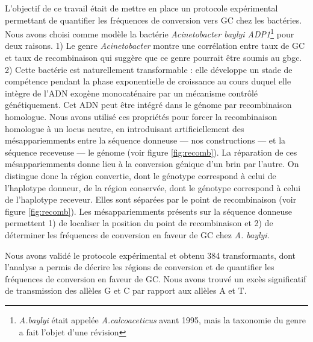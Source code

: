 L'objectif de ce travail était de mettre en place un protocole expérimental
permettant de quantifier les fréquences de conversion vers GC chez les
bactéries. Nous avons choisi comme modèle la bactérie \emph{Acinetobacter baylyi
  ADP1}\footnote{\emph{A.baylyi} était appelée \emph{A.calcoaceticus} avant
  1995, mais la taxonomie du genre a fait l'objet d'une
  révision\cite{euzeby_list_1997}} pour deux raisons. 1) Le genre
\emph{Acinetobacter} montre une corrélation entre taux de GC et taux de
recombinaison\cite{lassalle_gc-content_2015} qui suggère que ce genre pourrait
être soumis au \ac{gbgc}. 2) Cette bactérie est naturellement transformable :
elle développe un stade de compétence pendant la phase exponentielle de
croissance au cours duquel elle intègre de l'ADN exogène monocaténaire par un
mécanisme contrôlé génétiquement\cite{chen_dna_2004}. Cet ADN peut être intégré
dans le génome par recombinaison homologue. Nous avons utilisé ces propriétés
pour forcer la recombinaison homologue à un locus neutre, en introduisant
artificiellement des mésappariemments entre la séquence donneuse --- nos
constructions --- et la séquence receveuse --- le génome (voir figure
\ref{fig:recomb}). La réparation de ces mésappariemments donne lieu à la
conversion génique d'un brin par l'autre. On distingue donc la région convertie,
dont le génotype correspond à celui de l'haplotype donneur, de la région
conservée, dont le génotype correspond à celui de l'haplotype receveur. Elles
sont séparées par le point de recombinaison (voir figure \ref{fig:recomb}). Les
mésappariemments présents sur la séquence donneuse permettent 1) de localiser la
position du point de recombinaison et 2) de déterminer les fréquences de
conversion en faveur de GC chez \emph{A. baylyi}.

Nous avons validé le protocole expérimental et obtenu \num{384} transformants,
dont l'analyse a permis de décrire les régions de conversion et de quantifier
les fréquences de conversion en faveur de GC. Nous avons trouvé un excès
significatif de transmission des allèles G et C par rapport aux allèles A et T.

\newpage
%